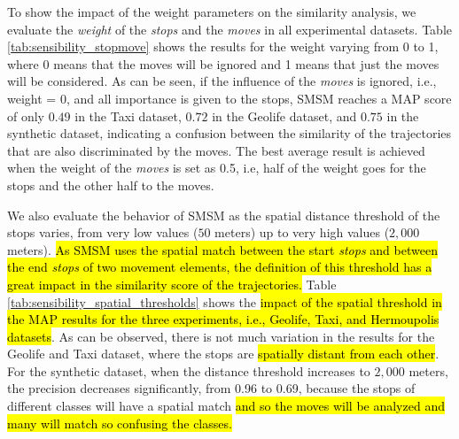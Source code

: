 To show the impact of the weight parameters on the similarity analysis, we evaluate the \emph{weight} of the \emph{stops} and the \emph{moves} in all experimental datasets. Table {\ref{tab:sensibility_stopmove}} shows the results for the weight varying from 0 to 1, where 0 means that the moves will be ignored and 1 means that just the moves will be considered.  As can be seen, if the influence of the \emph{moves} is ignored, i.e., weight = 0, and all importance is given to the stops, SMSM reaches a MAP score of only $0.49$ in the Taxi dataset, $0.72$ in the Geolife dataset, and $0.75$ in the synthetic dataset, indicating a confusion between the similarity of the trajectories that are also discriminated by the moves. The best average result is achieved when the weight of the \emph{moves} is set as 0.5, i.e, half of the weight goes for the stops and the other half to the moves.

\begin{table}[ht!]
  \scriptsize
  \centering
  \caption{Impact of the weights over the moves in trajectory similarity}
  \label{tab:sensibility_stopmove}
\end{table}

We also evaluate the behavior of SMSM as the spatial distance threshold of the stops varies, from very low values ($50$ meters) up to very high values ($2,000$ meters). \hl{As SMSM uses the spatial match between the start \emph{stops} and between the end \emph{stops} of two movement elements, the definition of this threshold has a great impact in the similarity score of the trajectories.} Table \ref{tab:sensibility_spatial_thresholds} shows the \hl{impact of the spatial threshold in the MAP results for the three experiments, i.e., Geolife, Taxi, and Hermoupolis datasets}. As can be observed, there is not much variation in the results for the Geolife and Taxi dataset, where the stops are \hl{spatially distant from each other}. For the synthetic dataset, when the distance threshold increases to $2,000$ meters, the precision decreases significantly, from 0.96 to 0.69, because the stops of different classes will have a spatial match \hl{and so the moves will be analyzed and many will match so confusing the classes.}

